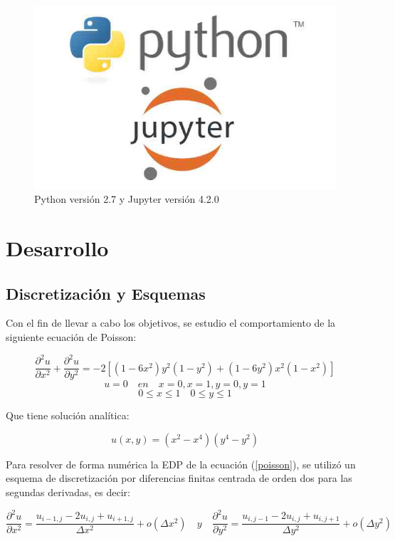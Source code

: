 \documentclass[letter,10pt]{article}
\begin{document}
\begin{figure}[H]
\centering
\includegraphics[scale=0.8]{img/lemguaje.jpg}
\caption{Python versión 2.7 y Jupyter versión 4.2.0}
\label{legunaje}
\end{figure}

\section{Desarrollo}

\subsection{Discretización y Esquemas}

Con el fin de llevar a cabo los objetivos, se estudio el comportamiento de la siguiente ecuación de Poisson:

\begin{equation}
\frac{\partial^2 u}{\partial x^2}+\frac{\partial^2 u}{\partial y^2} = -2[(1-6x^2)y^2(1-y^2)+(1-6y^2)x^2(1-x^2)]
\label{poisson}
\end{equation}
$$u=0\quad en\quad x=0,x=1,y=0,y=1$$
$$0\leq x \leq 1 \quad 0\leq y \leq 1$$

Que tiene solución analítica:

\begin{equation}
u(x,y) = (x^2-x^4)(y^4-y^2)
\label{solucionanalitica}
\end{equation}

Para resolver de forma numérica la EDP de la ecuación (\ref{poisson}), se utilizó un esquema de discretización por diferencias finitas centrada de orden dos para las segundas derivadas, es decir:

\begin{equation}
\frac{\partial^2 u}{\partial x^2}=\frac{u_{i-1,j}-2u_{i,j}+u_{i+1,j}}{\Delta x^2} + o(\Delta x^2) \quad y \quad \frac{\partial^2 u}{\partial y^2}=\frac{u_{i,j-1}-2u_{i,j}+u_{i,j+1}}{\Delta y^2}+ o(\Delta y^2)
\label{discret}
\end{equation}
\end{document}
